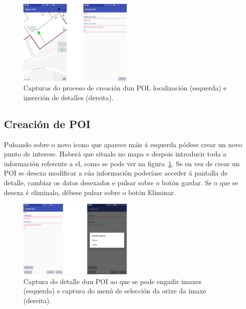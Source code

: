 \begin{figure}[h]
	\begin{center}
		\includegraphics[width=0.5\textwidth]{figures/android/mapaCrearPoi}
		\caption{Capturas do proceso de creación dun POI, localización (esquerda) e inserción de detalles (dereita).}
		\label{fig:mapaCrearPoi}
	\end{center}
\end{figure}

\subsection{Creación de POI}
Pulsando sobre o novo icono que aparece máis á esquerda pódese crear un novo punto de interese. Haberá que situalo no mapa e despois introducir toda a información referente a el, como se pode ver na figura~\ref{fig:mapaCrearPoi}. Se en vez de crear un POI se desexa modificar a súa información poderíase acceder á pantalla de detalle, cambiar os datos desexados e pulsar sobre o botón gardar. Se o que se desexa é eliminalo, débese pulsar sobre o botón Eliminar.

\begin{figure}[h]
	\begin{center}
		\includegraphics[width=0.5\textwidth]{figures/android/mapaEngadirImaxe}
		\caption{Captura do detalle dun POI ao que se pode engadir imaxes (esquerda) e captura do menú de selección da orixe da imaxe (dereita).}
		\label{fig:mapaEngadirImaxe}
	\end{center}
\end{figure}

